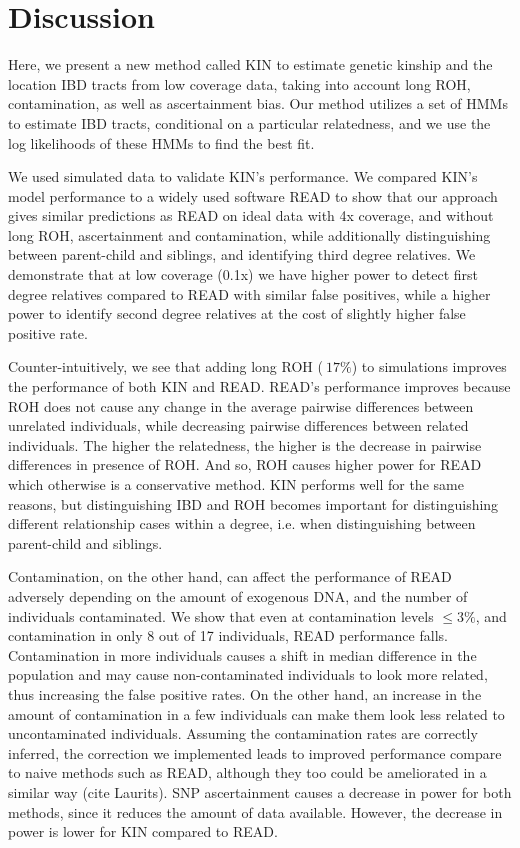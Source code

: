 \documentclass[12pt, letterpaper]{article}
\begin{document}
\section{Discussion}\label{discussion}

Here, we present a new method called KIN to estimate genetic kinship and the location IBD tracts from low coverage data, taking into account long ROH, contamination, as well as ascertainment bias. Our method utilizes a set of HMMs to estimate IBD tracts, conditional on a particular relatedness, and we use the log likelihoods of these HMMs to find the best fit. 

We used simulated data to validate KIN's performance. We compared KIN's model performance to a widely used software READ to show that our approach gives similar predictions as READ on ideal data with 4x coverage, and without long ROH, ascertainment and contamination, while additionally distinguishing between parent-child and siblings, and identifying third degree relatives. We demonstrate that at low coverage (0.1x) we have higher power to detect first degree relatives compared to READ with similar false positives, while a higher power to identify second degree relatives at the cost of slightly higher false positive rate.

Counter-intuitively, we see that adding long ROH ($~17\%$) to simulations improves the performance of both KIN and READ. READ's performance improves because ROH does not cause any change in the average pairwise differences between unrelated individuals, while decreasing pairwise differences between related individuals. The higher the relatedness, the higher is the decrease in pairwise differences in presence of ROH. And so, ROH causes higher power for READ which otherwise is a conservative method. KIN performs well for the same reasons, but distinguishing IBD and ROH becomes important for distinguishing different relationship cases within a degree, i.e. when distinguishing between parent-child and siblings.

Contamination, on the other hand, can affect the performance of READ adversely depending on the amount of exogenous DNA, and the number of individuals contaminated. We show that even at contamination levels  $\leq 3\%$, and contamination in only 8 out of 17 individuals, READ performance falls. Contamination in more individuals causes a shift in median difference in the population and may cause non-contaminated individuals to look more related, thus increasing the false positive rates. On the other hand, an increase in the amount of contamination in a few individuals can make them look less related to uncontaminated individuals. Assuming the contamination rates are correctly inferred, the correction we implemented leads to improved performance compare to naive methods such as READ, although they too could be ameliorated in a similar way (cite Laurits). SNP ascertainment causes a decrease in power for both  methods, since it reduces the amount of data available. However, the decrease in power is lower for KIN compared to READ.
\end{document}
